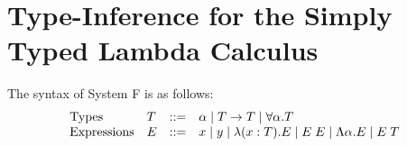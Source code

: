
\section{Type-Inference for the Simply Typed Lambda Calculus}

The syntax of System F is as follows: 
{\small
  \[ \begin{array}{llrl}
    \text{Types} & T & ::= & \alpha \mid T \arrow T 
    \mid \forall \alpha. T \\ 
    \text{Expressions} & E & ::=  & x \mid y \mid \lambda (x:T) . E \mid E\;E
    \mid \Lambda \alpha . E \mid E\;T 
  \end{array} \]}

\newcommand{\typeSrc}{T}
\newcommand{\envSrc}{G}
